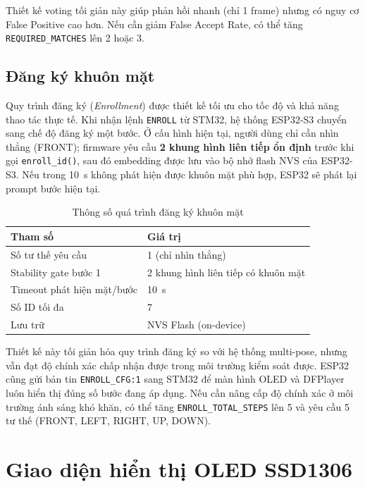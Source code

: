 Thiết kế voting tối giản này giúp phản hồi nhanh (chỉ 1 frame) nhưng có nguy cơ False Positive cao hơn. Nếu cần giảm False Accept Rate, có thể tăng \texttt{REQUIRED\_MATCHES} lên 2 hoặc 3.

\subsection{Đăng ký khuôn mặt}

Quy trình đăng ký (\textit{Enrollment}) được thiết kế tối ưu cho tốc độ và khả năng thao tác thực tế. Khi nhận lệnh \texttt{ENROLL} từ STM32, hệ thống ESP32-S3 chuyển sang chế độ đăng ký một bước. Ở cấu hình hiện tại, người dùng chỉ cần nhìn thẳng (FRONT); firmware yêu cầu \textbf{2 khung hình liên tiếp ổn định} trước khi gọi \texttt{enroll\_id()}, sau đó embedding được lưu vào bộ nhớ flash NVS của ESP32-S3. Nếu trong \SI{10}{s} không phát hiện được khuôn mặt phù hợp, ESP32 sẽ phát lại prompt bước hiện tại.

\begin{table}[H]
  \centering
  \caption{Thông số quá trình đăng ký khuôn mặt}
  \label{tab:enroll_params}
  \begin{tabularx}{0.8\textwidth}{l X}
    \toprule
    \textbf{Tham số} & \textbf{Giá trị} \\
    \midrule
    Số tư thế yêu cầu & 1 (chỉ nhìn thẳng) \\
    Stability gate bước 1 & 2 khung hình liên tiếp có khuôn mặt \\
    Timeout phát hiện mặt/bước & \SI{10}{s} \\
    Số ID tối đa & 7 \\
    Lưu trữ & NVS Flash (on-device) \\
    \bottomrule
  \end{tabularx}
\end{table}

Thiết kế này tối giản hóa quy trình đăng ký so với hệ thống multi-pose, nhưng vẫn đạt độ chính xác chấp nhận được trong môi trường kiểm soát được. ESP32 cũng gửi bản tin \texttt{ENROLL\_CFG:1} sang STM32 để màn hình OLED và DFPlayer luôn hiển thị đúng số bước đang áp dụng. Nếu cần nâng cấp độ chính xác ở môi trường ánh sáng khó khăn, có thể tăng \texttt{ENROLL\_TOTAL\_STEPS} lên 5 và yêu cầu 5 tư thế (FRONT, LEFT, RIGHT, UP, DOWN).

\section{Giao diện hiển thị OLED SSD1306}
\label{sec:oled}

